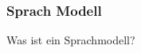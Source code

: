 \begin{frame}
  \frametitle{Sprach Modell}
  \tableofcontents
\end{frame}

Was ist ein Sprachmodell?
